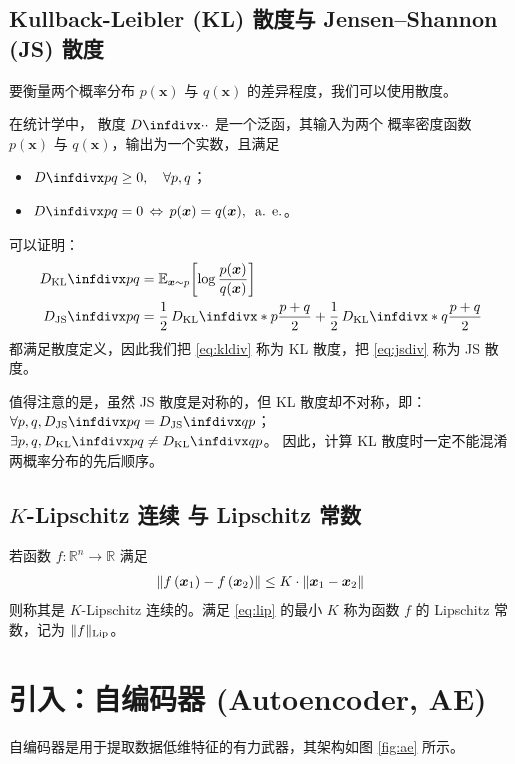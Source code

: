 \subsection{Kullback-Leibler (KL) 散度与 Jensen–Shannon (JS) 散度}
要衡量两个概率分布 $p(\bm x)$ 与 $q(\bm x)$ 的差异程度，我们可以使用散度。

在统计学中，
散度 $\Div{\cdot}{\cdot}$ 是一个泛函，其输入为两个
概率密度函数 $p(\bm x)$ 与 $q(\bm x)$，输出为一个实数，且满足
\begin{itemize}
	\item $\Div{p}{q} \ge 0, \quad  \forall p, q$；
	\item $\Div{p}{q} = 0 \, \Leftrightarrow \, p(\bm x) = q(\bm x), \, \text{  a. e.}$。
\end{itemize}
可以证明：
\begin{align}
	\DKL{p}{q} & = \EXPECT{\bm x \sim p}{\left[ {\log \frac{p(\bm x)}{q(\bm x)}} \right]} \label{eq:kldiv} \\
	\DJS{p}{q} & =
	\frac{1}{2}\, \DKL*{p}{\frac{p + q}{2}} +
	\frac{1}{2}\, \DKL*{q}{\frac{p + q}{2}} \label{eq:jsdiv}
\end{align}
都满足散度定义，因此我们把 \eqref{eq:kldiv} 称为 KL 散度，把 \eqref{eq:jsdiv} 称为 JS 散度。

值得注意的是，虽然 JS 散度是对称的，但 KL 散度却不对称，即：
$\forall p, q, \DJS{p}{q} = \DJS{q}{p}$；$\exists p, q, \DKL{p}{q} \ne \DKL{q}{p}$。%
因此，计算 KL 散度时一定不能混淆两概率分布的先后顺序。




\subsection{$K$-Lipschitz 连续 与 Lipschitz 常数}
若函数 $f: \mathbb{R}^n \to \mathbb{R}$ 满足
\begin{align}
	\Norm*{f\left( \bm x_1 \right)-f\left( \bm x_2 \right)} \leq K \cdot \Norm*{\bm x_1-\bm x_2}
	\label{eq:lip}
\end{align}
则称其是 $K$-Lipschitz 连续的。满足 \eqref{eq:lip} 的最小 $K$ 称为函数 $f$ 的 Lipschitz 常数，记为
$\lVert f\rVert_{\mathrm{Lip}}$。











\section{引入：自编码器 (Autoencoder, AE) \label{section:ae}}
自编码器是用于提取数据低维特征的有力武器，其架构如图 \ref{fig:ae} 所示。

